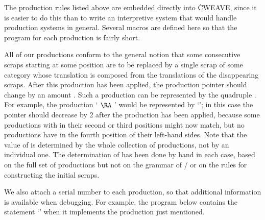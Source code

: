 The production rules listed above are embedded directly into \.{CWEAVE},
since it is easier to do this than to write an interpretive system
that would handle production systems in general. Several macros are defined
here so that the program for each production is fairly short.

All of our productions conform to the general notion that some 
consecutive scraps starting at some position  are to be replaced by a
single scrap of some category  whose translation is composed from the
translations of the disappearing scraps. After this production has been
applied, the production pointer  should change by an amount . Such
a production can be represented by the quadruple . For
example,
the production ` $\RA$ ' would be
represented by
`'; in this case the pointer 
should decrease by 2
after the production has been applied, because some productions with
 in their second or third positions might now match,
but no productions have
 in the fourth position of their left-hand sides. Note that
the value of  is determined by the whole collection of productions, not
by an individual one.
The determination of  has been
done by hand in each case, based on the full set of productions but not on
the grammar of \CEE/ or on the rules for constructing the initial
scraps.

We also attach a serial number to each production, so that additional
information is available when debugging. For example, the program below
contains the statement `'
when it implements
the production just mentioned.

